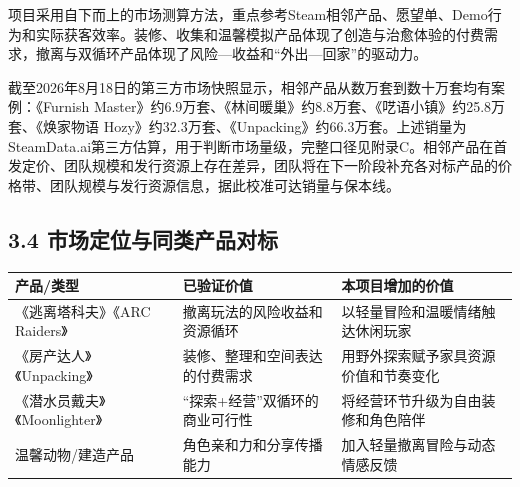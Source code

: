 \documentclass[UTF8,fontset=none,zihao=5,twoside]{ctexart}
\newcounter{none}
\newenvironment{BusinessTable}{%
  \begingroup
  \small
  \setlength{\parindent}{0pt}%
  \setlength{\parskip}{0pt}%
  \rowcolors{2}{TableAlt}{white}%
}{%
  \endgroup
}
\begin{document}
项目采用自下而上的市场测算方法，重点参考Steam相邻产品、愿望单、Demo行为和实际获客效率。装修、收集和温馨模拟产品体现了创造与治愈体验的付费需求，撤离与双循环产品体现了风险---收益和``外出---回家''的驱动力。

截至2026年8月18日的第三方市场快照显示，相邻产品从数万套到数十万套均有案例：《Furnish Master》约6.9万套、《林间暖巢》约8.8万套、《呓语小镇》约25.8万套、《焕家物语 Hozy》约32.3万套、《Unpacking》约66.3万套。上述销量为SteamData.ai第三方估算，用于判断市场量级，完整口径见附录C。相邻产品在首发定价、团队规模和发行资源上存在差异，团队将在下一阶段补充各对标产品的价格带、团队规模与发行资源信息，据此校准可达销量与保本线。

\subsection{3.4 市场定位与同类产品对标}\label{34-ux5e02ux573aux5b9aux4f4dux4e0eux540cux7c7bux4ea7ux54c1ux5bf9ux6807}

\begin{BusinessTable}

{\def\LTcaptype{none} %
\begin{longtable}[]{@{}
  >{\raggedright\arraybackslash}p{}
  >{\raggedright\arraybackslash}p{}
  >{\raggedright\arraybackslash}p{}@{}}
\toprule\noalign{}
\begin{minipage}[b]{\linewidth}\raggedright
\cellcolor{TableHeader}\color{BrandBlue}\bfseries 产品/类型
\end{minipage} & \begin{minipage}[b]{\linewidth}\raggedright
\cellcolor{TableHeader}\color{BrandBlue}\bfseries 已验证价值
\end{minipage} & \begin{minipage}[b]{\linewidth}\raggedright
\cellcolor{TableHeader}\color{BrandBlue}\bfseries 本项目增加的价值
\end{minipage} \\
\midrule\noalign{}
\endhead
\bottomrule\noalign{}
\endlastfoot
《逃离塔科夫》《ARC Raiders》 & 撤离玩法的风险收益和资源循环 & 以轻量冒险和温暖情绪触达休闲玩家 \\
《房产达人》《Unpacking》 & 装修、整理和空间表达的付费需求 & 用野外探索赋予家具资源价值和节奏变化 \\
《潜水员戴夫》《Moonlighter》 & ``探索+经营''双循环的商业可行性 & 将经营环节升级为自由装修和角色陪伴 \\
温馨动物/建造产品 & 角色亲和力和分享传播能力 & 加入轻量撤离冒险与动态情感反馈 \\
\end{longtable}
}

\end{BusinessTable}
\end{document}
